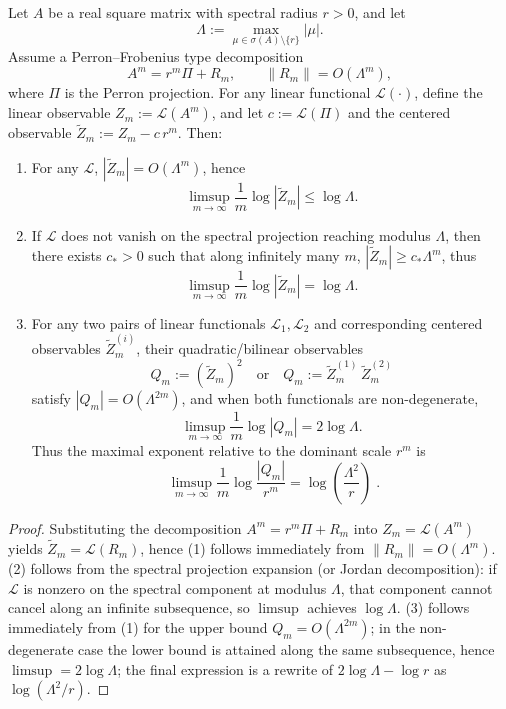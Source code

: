 \begin{proposition}\label{prop:pom-deltaq-quadratic-observable-max-exponent}
Let \(A\) be a real square matrix with spectral radius \(r>0\), and let
\[
\Lambda:=\max_{\mu\in\sigma(A)\setminus\{r\}}|\mu|.
\]
Assume a Perron--Frobenius type decomposition
\[
A^m=r^m\Pi+R_m,\qquad \|R_m\|=O(\Lambda^m),
\]
where \(\Pi\) is the Perron projection.
For any linear functional \(\mathcal L(\cdot)\), define the linear observable \(Z_m:=\mathcal L(A^m)\), and let \(c:=\mathcal L(\Pi)\) and the centered observable \(\widetilde Z_m:=Z_m-c\,r^m\).
Then:
\begin{enumerate}
  \item For any \(\mathcal L\), \(|\widetilde Z_m|=O(\Lambda^m)\), hence
  \[
  \limsup_{m\to\infty}\frac{1}{m}\log|\widetilde Z_m|\le \log\Lambda.
  \]
  \item If \(\mathcal L\) does not vanish on the spectral projection reaching modulus \(\Lambda\), then there exists \(c_\ast>0\) such that along infinitely many \(m\), \(|\widetilde Z_m|\ge c_\ast \Lambda^m\), thus
  \[
  \limsup_{m\to\infty}\frac{1}{m}\log|\widetilde Z_m|=\log\Lambda.
  \]
  \item For any two pairs of linear functionals \(\mathcal L_1,\mathcal L_2\) and corresponding centered observables \(\widetilde Z^{(i)}_m\), their quadratic/bilinear observables
  \[
  Q_m:=(\widetilde Z_m)^2\quad\text{or}\quad Q_m:=\widetilde Z^{(1)}_m\,\widetilde Z^{(2)}_m
  \]
  satisfy \(|Q_m|=O(\Lambda^{2m})\), and when both functionals are non-degenerate,
  \[
  \limsup_{m\to\infty}\frac{1}{m}\log|Q_m|=2\log\Lambda.
  \]
  Thus the maximal exponent relative to the dominant scale \(r^m\) is
  \[
  \boxed{\;
  \limsup_{m\to\infty}\frac{1}{m}\log\frac{|Q_m|}{r^m}
  =\log\!\left(\frac{\Lambda^2}{r}\right)\; }.
  \]
\end{enumerate}
\end{proposition}
\begin{proof}
Substituting the decomposition \(A^m=r^m\Pi+R_m\) into \(Z_m=\mathcal L(A^m)\) yields
\(
\widetilde Z_m=\mathcal L(R_m)
\), hence (1) follows immediately from \(\|R_m\|=O(\Lambda^m)\).
(2) follows from the spectral projection expansion (or Jordan decomposition): if \(\mathcal L\) is nonzero on the spectral component at modulus \(\Lambda\), that component cannot cancel along an infinite subsequence, so \(\limsup\) achieves \(\log\Lambda\).
(3) follows immediately from (1) for the upper bound \(Q_m=O(\Lambda^{2m})\); in the non-degenerate case the lower bound is attained along the same subsequence, hence \(\limsup=2\log\Lambda\); the final expression is a rewrite of \(2\log\Lambda-\log r\) as \(\log(\Lambda^2/r)\).
\end{proof}

